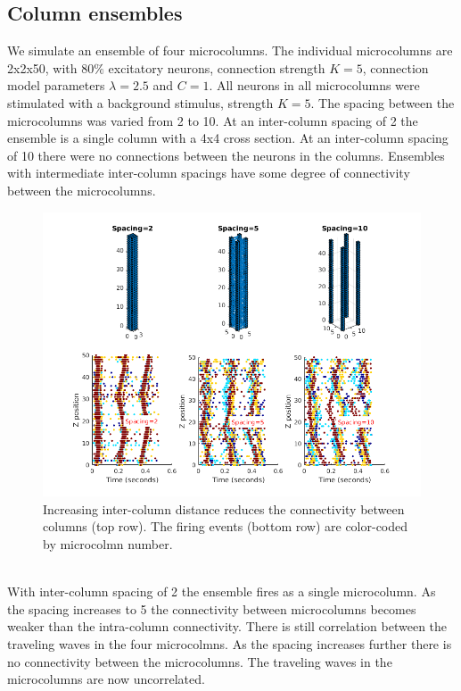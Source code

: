 \documentclass[a4paper,11pt]{article}
\begin{document}
\subsection{Column ensembles}
We simulate an ensemble of four microcolumns. 
The individual microcolumns are 2x2x50, with $80\%$ excitatory neurons, connection strength $K=5$, connection model parameters $\lambda=2.5$ and $C=1$.
All neurons in all microcolumns were stimulated with a background stimulus, strength $K=5$.
The spacing between the microcolumns was varied from 2 to 10. 
At an inter-column spacing of 2 the ensemble is a single column with a 4x4 cross section.
At an inter-column spacing of 10 there were no connections between the neurons in the columns.
Ensembles with intermediate inter-column spacings have some degree of connectivity between the microcolumns.
\begin{figure}[!htb]
 \caption{Increasing inter-column distance reduces the connectivity between columns (top row). The firing events (bottom row) are color-coded by microcolmn number. }
 \label{fig:ensemble}
 \centering
   \includegraphics[width=\textwidth]{fig/ColumnEnsemble}
\end{figure}
\\
With inter-column spacing of 2 the ensemble fires as a single microcolumn.
As the spacing increases to 5 the connectivity between microcolumns becomes weaker than the intra-column connectivity.
There is still correlation between the traveling waves in the four microcolmns.
As the spacing increases further there is no connectivity between the microcolumns.
The traveling waves in the microcolumns are now uncorrelated.
\end{document}
